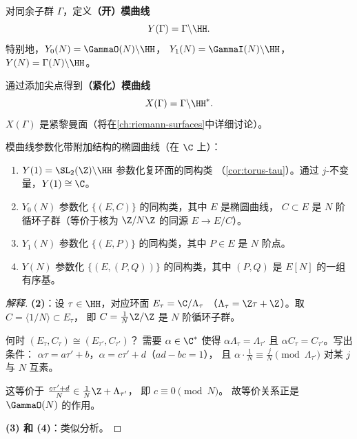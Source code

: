 \begin{definition}[模曲线]
\label{def:modular-curves}
对同余子群 $\Gamma$，定义\textbf{（开）模曲线}
\[
  Y(\Gamma) = \Gamma \backslash \HH.
\]
特别地，$Y_0(N) = \GammaO(N) \backslash \HH$，
$Y_1(N) = \GammaI(N) \backslash \HH$，
$Y(N) = \Gamma(N) \backslash \HH$。

通过添加尖点得到\textbf{（紧化）模曲线}
\[
  X(\Gamma) = \Gamma \backslash \HH^*.
\]
$X(\Gamma)$ 是紧黎曼面（将在\cref{ch:riemann-surfaces}中详细讨论）。
\end{definition}

\begin{theorem}[模诠释]
\label{thm:moduli-interpretation}
模曲线参数化带附加结构的椭圆曲线（在 $\C$ 上）：
\begin{enumerate}
  \item $Y(1) = \SL_2(\Z) \backslash \HH$ 参数化复环面的同构类
    （\cref{cor:torus-tau}）。通过 $j$-不变量，$Y(1) \cong \C$。
  \item $Y_0(N)$ 参数化 $\{(E, C)\}$ 的同构类，其中 $E$ 是椭圆曲线，
    $C \subset E$ 是 $N$ 阶循环子群（等价于核为 $\Z/N\Z$ 的同源
    $E \to E/C$）。
  \item $Y_1(N)$ 参数化 $\{(E, P)\}$ 的同构类，其中 $P \in E$ 是
    $N$ 阶点。
  \item $Y(N)$ 参数化 $\{(E, (P, Q))\}$ 的同构类，其中 $(P, Q)$ 是
    $E[N]$ 的一组有序基。
\end{enumerate}
\end{theorem}

\begin{proof}[解释]
\textbf{(2)}：设 $\tau \in \HH$，对应环面 $E_\tau = \C/\Lambda_\tau$
（$\Lambda_\tau = \Z\tau + \Z$）。取 $C = \langle 1/N \rangle \subset E_\tau$，
即 $C = \frac{1}{N}\Z/\Z$ 是 $N$ 阶循环子群。

何时 $(E_\tau, C_\tau) \cong (E_{\tau'}, C_{\tau'})$？
需要 $\alpha \in \C^*$ 使得 $\alpha\Lambda_\tau = \Lambda_{\tau'}$
且 $\alpha C_\tau = C_{\tau'}$。写出条件：
$\alpha\tau = a\tau' + b$，$\alpha = c\tau' + d$（$ad - bc = 1$），
且 $\alpha \cdot \frac{1}{N} \equiv \frac{j}{N} \pmod{\Lambda_{\tau'}}$
对某 $j$ 与 $N$ 互素。

这等价于 $\frac{c\tau' + d}{N} \in \frac{1}{N}\Z + \Lambda_{\tau'}$，
即 $c \equiv 0 \pmod{N}$。
故等价关系正是 $\GammaO(N)$ 的作用。

\textbf{(3) 和 (4)}：类似分析。
\end{proof}


